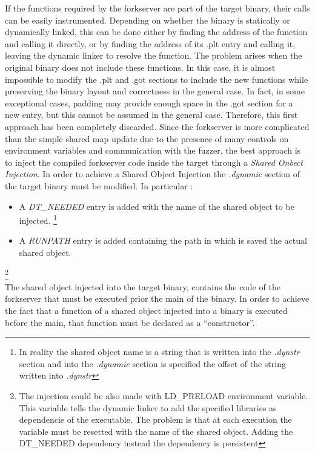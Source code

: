 If the functions required by the forkserver are part of the target binary, their calls can be easily instrumented. 
Depending on whether the binary is statically or dynamically linked, this can be done either by finding the address 
of the function and calling it directly, or by finding the address of its .plt entry and calling it, 
leaving the dynamic linker to resolve the function. 
The problem arises when the original binary does not include these functions. 
In this case, it is almost impossible to modify the .plt and .got sections to include the new functions 
while preserving the binary layout and correctness in the general case. In fact, in some exceptional cases, 
padding may provide enough space in the .got section for a new entry, but this cannot be assumed in the general case. 
Therefore, this first approach has been completely discarded.
Since the forkserver is more complicated than the simple shared map update due to the presence of many controls on 
environment variables and communication with the fuzzer, 
the best approach is to inject the compiled forkserver code inside the target through a \textit{Shared Onbect Injection}.
In order to achieve a Shared Object Injection the \textit{.dynamic} section of the target binary must be modified.
In particular :
\begin{itemize}
    \item A \textit{DT\_NEEDED} entry is added with the name of the shared object to be injected. \footnote{ In reality 
        the shared object name is a string that is written into the \textit{.dynstr} section and into the 
        \textit{.dynamic} section is specified the offset of the string written into \textit{.dynstr}}
    \item A \textit{RUNPATH} entry is added containing the path in which is saved the actual shared object.
\end{itemize}
\footnote{
    The injection could be also made with LD\_PRELOAD environment variable. 
    This variable tells the dynamic linker to add the specified libraries as dependencie of the executable.
    The problem is that at each execution the variable must be resetted with the name of the shared object.
    Adding the DT\_NEEDED dependency instead the dependency is persistent
}\\
The shared object injected into the target binary, contains the code of the forkserver that must be executed 
prior the main of the binary.
In order to achieve the fact that a function of a shared object injected into a binary is executed before the main, 
that function must be declared as a ``constructor''.
